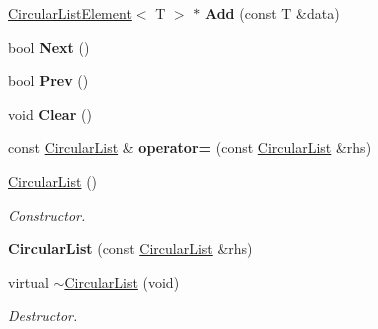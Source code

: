 \begin{DoxyCompactItemize}
\item 
\hypertarget{class_h_a_c_d_1_1_circular_list_adbf5eb7b14590d18f9a3e9cd7f2c87c5}{\hyperlink{class_h_a_c_d_1_1_circular_list_element}{Circular\+List\+Element}$<$ T $>$ $\ast$ {\bfseries Add} (const T \&data)}\label{class_h_a_c_d_1_1_circular_list_adbf5eb7b14590d18f9a3e9cd7f2c87c5}

\item 
\hypertarget{class_h_a_c_d_1_1_circular_list_a2c744c863e8121098c9c5b61af08316d}{bool {\bfseries Next} ()}\label{class_h_a_c_d_1_1_circular_list_a2c744c863e8121098c9c5b61af08316d}

\item 
\hypertarget{class_h_a_c_d_1_1_circular_list_a699b31faed3de484dfacaa0da7690fb7}{bool {\bfseries Prev} ()}\label{class_h_a_c_d_1_1_circular_list_a699b31faed3de484dfacaa0da7690fb7}

\item 
\hypertarget{class_h_a_c_d_1_1_circular_list_a7e26666898ec33a28964f4d9dcb8f675}{void {\bfseries Clear} ()}\label{class_h_a_c_d_1_1_circular_list_a7e26666898ec33a28964f4d9dcb8f675}

\item 
\hypertarget{class_h_a_c_d_1_1_circular_list_a181b9ac6be45609c99fce229850a026a}{const \hyperlink{class_h_a_c_d_1_1_circular_list}{Circular\+List} \& {\bfseries operator=} (const \hyperlink{class_h_a_c_d_1_1_circular_list}{Circular\+List} \&rhs)}\label{class_h_a_c_d_1_1_circular_list_a181b9ac6be45609c99fce229850a026a}

\item 
\hypertarget{class_h_a_c_d_1_1_circular_list_ac16d249edaa0022fe94c74b9b7877b24}{\hyperlink{class_h_a_c_d_1_1_circular_list_ac16d249edaa0022fe94c74b9b7877b24}{Circular\+List} ()}\label{class_h_a_c_d_1_1_circular_list_ac16d249edaa0022fe94c74b9b7877b24}

\begin{DoxyCompactList}\small\item\em Constructor. \end{DoxyCompactList}\item 
\hypertarget{class_h_a_c_d_1_1_circular_list_afacc0508aa38d1385d7e4ef05461cfd9}{{\bfseries Circular\+List} (const \hyperlink{class_h_a_c_d_1_1_circular_list}{Circular\+List} \&rhs)}\label{class_h_a_c_d_1_1_circular_list_afacc0508aa38d1385d7e4ef05461cfd9}

\item 
\hypertarget{class_h_a_c_d_1_1_circular_list_a7c586aa337375aadaf68db5fe6d0e8eb}{virtual \hyperlink{class_h_a_c_d_1_1_circular_list_a7c586aa337375aadaf68db5fe6d0e8eb}{$\sim$\+Circular\+List} (void)}\label{class_h_a_c_d_1_1_circular_list_a7c586aa337375aadaf68db5fe6d0e8eb}

\begin{DoxyCompactList}\small\item\em Destructor. \end{DoxyCompactList}\end{DoxyCompactItemize}


